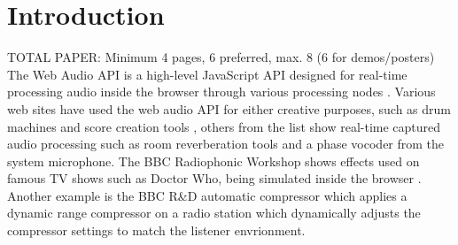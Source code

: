 \documentclass{article}
\title{\papertitle}
\begin{document}
%
\capstartfalse
\maketitle
\capstarttrue
%
\begin{abstract}
New functionality in HTML5, notably its Web Audio API, allow for increasingly powerful applications in the browser. %
Perceptual evaluation tests for audio, where the subject assesses certain qualities of different audio fragments through a graphical user interface and/or text boxes, require playback of audio and rapid switching between different files. %
The advantage of a web application is easy deployment on any platform, without requiring any other application or library, easy storing of results on a server. 
[...]

\end{abstract}
%

\section{Introduction}\label{sec:introduction}

TOTAL PAPER: Minimum 4 pages, 6 preferred, max. 8 (6 for demos/posters)\\ 


The Web Audio API is a high-level JavaScript API designed for real-time processing audio inside the browser through various processing nodes \cite{webaudioapi}. %
Various web sites have used the web audio API for either creative purposes, such as drum machines and score creation tools \cite{webaudiodemo}, %
others from the list show real-time captured audio processing such as room reverberation tools and a phase vocoder from the system microphone. The BBC Radiophonic Workshop shows effects used on famous TV shows such as Doctor Who, being simulated inside the browser \cite{bbcradiophonics}. %
Another example is the BBC R\&D automatic compressor which applies a dynamic range compressor on a radio station which dynamically adjusts the compressor settings to match the listener envrionment. %
\end{document}
